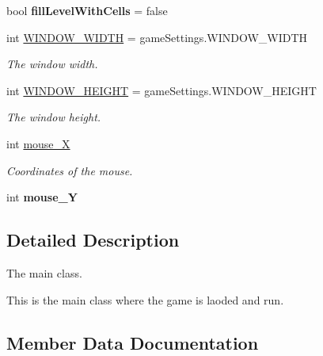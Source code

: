 \begin{DoxyCompactItemize}
\mbox{\label{class_space_game_a969661713225da053f9c046f7ce2415b}} 
bool {\bfseries fill\+Level\+With\+Cells} = false
\item 
\mbox{\label{class_space_game_ac1ec1fbe39ce5b122675a7fd668c8ea3}} 
int \hyperlink{class_space_game_ac1ec1fbe39ce5b122675a7fd668c8ea3}{W\+I\+N\+D\+O\+W\+\_\+\+W\+I\+D\+TH} = game\+Settings.\+W\+I\+N\+D\+O\+W\+\_\+\+W\+I\+D\+TH
\begin{DoxyCompactList}\small\item\em The window width. \end{DoxyCompactList}\item 
\mbox{\label{class_space_game_aa557f0135ff2281fbfe7eaa69723b6c5}} 
int \hyperlink{class_space_game_aa557f0135ff2281fbfe7eaa69723b6c5}{W\+I\+N\+D\+O\+W\+\_\+\+H\+E\+I\+G\+HT} = game\+Settings.\+W\+I\+N\+D\+O\+W\+\_\+\+H\+E\+I\+G\+HT
\begin{DoxyCompactList}\small\item\em The window height. \end{DoxyCompactList}\item 
\mbox{\label{class_space_game_a23e048b8ccf23343a4f9a9f67d1df3ba}} 
int \hyperlink{class_space_game_a23e048b8ccf23343a4f9a9f67d1df3ba}{mouse\+\_\+X}
\begin{DoxyCompactList}\small\item\em Coordinates of the mouse. \end{DoxyCompactList}\item 
\mbox{\label{class_space_game_a503f8ad7c3466ce91ab40f74b29b0097}} 
int {\bfseries mouse\+\_\+Y}
\end{DoxyCompactItemize}


\subsection{Detailed Description}
The main class. 

This is the main class where the game is laoded and run. 

\subsection{Member Data Documentation}
\mbox{\label{class_space_game_a59e762b653e6952d65f8dd51b055bc2f}} 
